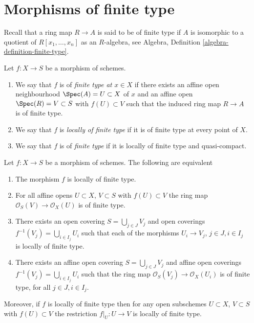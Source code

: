 \section{Morphisms of finite type}
\label{section-finite-type}

\noindent
Recall that a ring map $R \to A$ is said to be of finite type if
$A$ is isomorphic to a quotient of $R[x_1, \ldots, x_n]$ as an $R$-algebra, see
Algebra, Definition \ref{algebra-definition-finite-type}.

\begin{definition}
\label{definition-finite-type}
Let $f : X \to S$ be a morphism of schemes.
\begin{enumerate}
\item We say that $f$ is of {\it finite type at $x \in X$} if
there exists an affine open neighbourhood $\Spec(A) = U \subset X$
of $x$ and an affine open $\Spec(R) = V \subset S$
with $f(U) \subset V$ such that the induced ring map
$R \to A$ is of finite type.
\item We say that $f$ is {\it locally of finite type} if it is
of finite type at every point of $X$.
\item We say that $f$ is of {\it finite type} if it is locally of
finite type and quasi-compact.
\end{enumerate}
\end{definition}

\begin{lemma}
\label{lemma-locally-finite-type-characterize}
Let $f : X \to S$ be a morphism of schemes.
The following are equivalent
\begin{enumerate}
\item The morphism $f$ is locally of finite type.
\item For all affine opens $U \subset X$, $V \subset S$
with $f(U) \subset V$ the ring map
$\mathcal{O}_S(V) \to \mathcal{O}_X(U)$ is of finite type.
\item There exists an open covering $S = \bigcup_{j \in J} V_j$
and open coverings $f^{-1}(V_j) = \bigcup_{i \in I_j} U_i$ such
that each of the morphisms $U_i \to V_j$, $j\in J, i\in I_j$
is locally of finite type.
\item There exists an affine open covering $S = \bigcup_{j \in J} V_j$
and affine open coverings $f^{-1}(V_j) = \bigcup_{i \in I_j} U_i$ such
that the ring map $\mathcal{O}_S(V_j) \to \mathcal{O}_X(U_i)$ is
of finite type, for all $j\in J, i\in I_j$.
\end{enumerate}
Moreover, if $f$ is locally of finite type then for
any open subschemes $U \subset X$, $V \subset S$ with $f(U) \subset V$
the restriction $f|_U : U \to V$ is locally of finite type.
\end{lemma}

